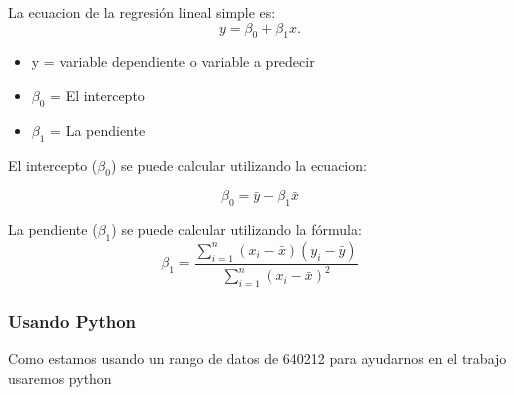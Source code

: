 \documentclass{article}
\begin{document}
La ecuacion de la regresión lineal simple es:
\[
  y = \beta_0 + \beta_1x .   
\]
\begin{itemize}
  \item y = variable dependiente o variable a predecir
  \item \( \beta_0 \) = El intercepto 
  \item \( \beta_1 \) = La pendiente
\end{itemize}

El intercepto (\( \beta_0 \)) se puede calcular utilizando la ecuacion:

\[ \beta_0 = \bar{y} - \beta_1 \bar{x} \]

 La pendiente (\( \beta_1 \)) se puede calcular utilizando la fórmula:
 \[ \beta_1 = \frac{{\sum_{i=1}^{n}(x_i - \bar{x})(y_i - \bar{y})}}{{\sum_{i=1}^{n}(x_i - \bar{x})^2}} \]

\subsubsection{Usando Python}

Como estamos usando un rango de datos de 640212 para ayudarnos en el trabajo usaremos python
\end{document}
